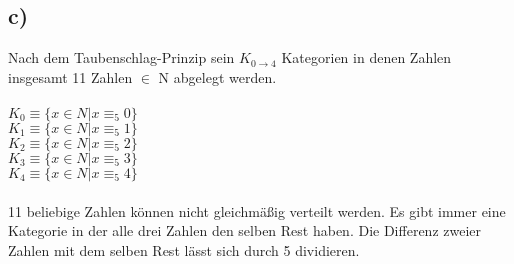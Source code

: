 \documentclass{article}
\begin{document}
	\subsection*{c)}
	Nach dem Taubenschlag-Prinzip sein $K_{0 \to 4}$ Kategorien in denen Zahlen insgesamt 11 Zahlen $\in$ N abgelegt werden. \\ \\
	$K_0 \equiv \{x \in N | x \equiv_5 0\}$ \\
	$K_1 \equiv \{x \in N | x \equiv_5 1\}$ \\
	$K_2 \equiv \{x \in N | x \equiv_5 2\}$ \\
	$K_3 \equiv \{x \in N | x \equiv_5 3\}$ \\
	$K_4 \equiv \{x \in N | x \equiv_5 4\}$ \\
	\\
	11 beliebige Zahlen können nicht gleichmäßig verteilt werden. Es gibt immer eine Kategorie in der alle drei Zahlen den selben Rest haben. Die Differenz zweier Zahlen mit dem selben Rest lässt sich durch 5 dividieren.
\end{document}
